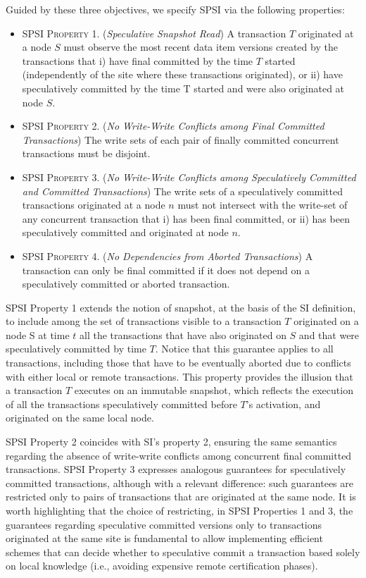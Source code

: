 Guided by these three objectives, we specify SPSI via the following properties:
\begin{itemize}
\item \textsc{SPSI Property 1.} (\textit{Speculative Snapshot Read}) A transaction $T$ originated at a node $S$ must observe the most recent data item versions created by the transactions that i) have final committed by the time $T$ started (independently of the site where these transactions originated), or ii) have speculatively committed by the time T started and were also originated at node $S$.
\item \textsc{SPSI Property 2.} (\textit{No Write-Write Conflicts among Final Committed Transactions}) The write sets of
each pair of finally committed concurrent transactions must be disjoint.
\item \textsc{SPSI Property 3.} (\textit{No Write-Write Conflicts among Speculatively Committed and Committed Transactions}) The write sets of a speculatively committed transactions originated at a node $n$ must not intersect with the write-set of any concurrent transaction that i) has been final committed, or ii) has been speculatively committed and originated at node $n$.
\item \textsc{SPSI Property 4.} (\textit{No Dependencies from Aborted Transactions}) A transaction can only be final committed if it does not depend on a speculatively committed or aborted transaction.
\end{itemize}

SPSI Property 1 extends the notion of snapshot, at the basis of the SI definition, to include among the set of  transactions visible to a transaction $T$ originated on a node S at time $t$ all the transactions that have also originated on $S$ and that were speculatively committed by time $T$. Notice that this guarantee applies to all transactions, including those that have to be eventually aborted due to conflicts with either local or remote transactions. This property provides the illusion that a transaction $T$ executes on an immutable snapshot, which reflects the execution of all the transactions speculatively committed before $T$'s activation, and originated on the same local node. 

SPSI Property 2 coincides with SI's property 2, ensuring the same semantics regarding the absence of write-write conflicts among concurrent final committed transactions. SPSI Property 3 expresses analogous guarantees for speculatively committed transactions, although with a relevant difference: such guarantees are restricted only to pairs of transactions that are originated at the same node. It is worth highlighting that the choice of restricting, in SPSI Properties 1 and 3, the guarantees regarding speculative committed versions only to transactions originated at the same site is fundamental to allow implementing efficient schemes that can decide whether to speculative commit a transaction based solely on local knowledge (i.e., avoiding expensive remote certification phases).

